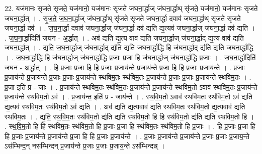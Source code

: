 \documentclass[17pt]{extarticle}
\begin{document}
22. यज॑मानः सृजते सृजते॒ यज॑मानो॒ यज॑मानः सृजते जघना॒र्द्धाज् ज॑घना॒र्द्धाथ् सृ॑जते॒ यज॑मानो॒ यज॑मानः सृजते जघना॒र्द्धात् । . सृ॒ज॒ते॒ ज॒घ॒ना॒र्द्धाज् ज॑घना॒र्द्धाथ् सृ॑जते सृजते जघना॒र्द्धा दवाव॑ जघना॒र्द्धाथ् सृ॑जते सृजते जघना॒र्द्धा दव॑ । . ज॒घ॒ना॒र्द्धा दवाव॑ जघना॒र्द्धाज् ज॑घना॒र्द्धा दव॑ द्यति द्य॒त्यव॑ जघना॒र्द्धाज् ज॑घना॒र्द्धा दव॑ द्यति । . ज॒घ॒ना॒र्द्धादिति॑ जघन - अ॒र्द्धात् । . अव॑ द्यति द्य॒त्य वाव॑ द्यति जघना॒र्द्धाज् ज॑घना॒र्द्धाद् द्य॒त्य वाव॑ द्यति जघना॒र्द्धात् । . द्य॒ति॒ ज॒घ॒ना॒र्द्धाज् ज॑घना॒र्द्धाद् द्य॑ति द्यति जघना॒र्द्धाद्धि हि ज॑घना॒र्द्धाद् द्य॑ति द्यति जघना॒र्द्धाद्धि । . ज॒घ॒ना॒र्द्धाद्धि हि ज॑घना॒र्द्धाज् ज॑घना॒र्द्धाद्धि प्र॒जाः प्र॒जा हि ज॑घना॒र्द्धाज् ज॑घना॒र्द्धाद्धि प्र॒जाः । . ज॒घ॒ना॒र्द्धादिति॑ जघन - अ॒र्द्धात् । . हि प्र॒जाः प्र॒जा हि हि प्र॒जाः प्र॒जाय॑न्ते प्र॒जाय॑न्ते प्र॒जा हि हि प्र॒जाः प्र॒जाय॑न्ते । . प्र॒जाः प्र॒जाय॑न्ते प्र॒जाय॑न्ते प्र॒जाः प्र॒जाः प्र॒जाय॑न्ते स्थविम॒तः स्थ॑विम॒तः प्र॒जाय॑न्ते प्र॒जाः प्र॒जाः प्र॒जाय॑न्ते स्थविम॒तः । . प्र॒जा इति॑ प्र - जाः । . प्र॒जाय॑न्ते स्थविम॒तः स्थ॑विम॒तः प्र॒जाय॑न्ते प्र॒जाय॑न्ते स्थविम॒तो ऽवाव॑ स्थविम॒तः प्र॒जाय॑न्ते प्र॒जाय॑न्ते स्थविम॒तो ऽव॑ । . प्र॒जाय॑न्त॒ इति॑ प्र - जाय॑न्ते । . स्थ॒वि॒म॒तो ऽवाव॑ स्थविम॒तः स्थ॑विम॒तो ऽव॑ द्यति द्य॒त्यव॑ स्थविम॒तः स्थ॑विम॒तो ऽव॑ द्यति । . अव॑ द्यति द्य॒त्यवाव॑ द्यति स्थविम॒तः स्थ॑विम॒तो द्य॒त्यवाव॑ द्यति स्थविम॒तः । . द्य॒ति॒ स्थ॒वि॒म॒तः स्थ॑विम॒तो द्य॑ति द्यति स्थविम॒तो हि हि स्थ॑विम॒तो द्य॑ति द्यति स्थविम॒तो हि । . स्थ॒वि॒म॒तो हि हि स्थ॑विम॒तः स्थ॑विम॒तो हि प्र॒जाः प्र॒जा हि स्थ॑विम॒तः स्थ॑विम॒तो हि प्र॒जाः । . हि प्र॒जाः प्र॒जा हि हि प्र॒जाः प्र॒जाय॑न्ते प्र॒जाय॑न्ते प्र॒जा हि हि प्र॒जाः प्र॒जाय॑न्ते । . प्र॒जाः प्र॒जाय॑न्ते प्र॒जाय॑न्ते प्र॒जाः प्र॒जाः प्र॒जाय॒न्ते ऽस॑म्भिन्द॒न् नस॑म्भिन्दन् प्र॒जाय॑न्ते प्र॒जाः प्र॒जाः प्र॒जाय॒न्ते ऽस॑म्भिन्दन्न् । \newline
\end{document}

